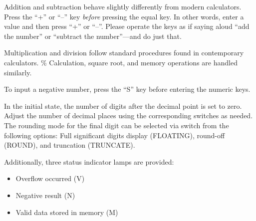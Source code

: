 Addition and subtraction behave slightly differently from modern calculators. Press the ``+'' or ``--'' key \emph{before} pressing the equal key. In other words, enter a value and then press ``+'' or ``--''. Please operate the keys as if saying aloud ``add the number'' or ``subtract the number''—and do just that.

Multiplication and division follow standard procedures found in contemporary calculators. \% Calculation, square root, and memory operations are handled similarly.

To input a negative number, press the ``S'' key before entering the numeric keys.

In the initial state, the number of digits after the decimal point is set to zero. Adjust the number of decimal places using the corresponding switches as needed. The rounding mode for the final digit can be selected via switch from the following options: Full significant digits display (FLOATING), round-off (ROUND), and truncation (TRUNCATE).

Additionally, three status indicator lamps are provided:
\begin{itemize}
  \item Overflow occurred (V)
  \item Negative result (N)
  \item Valid data stored in memory (M)
\end{itemize}

